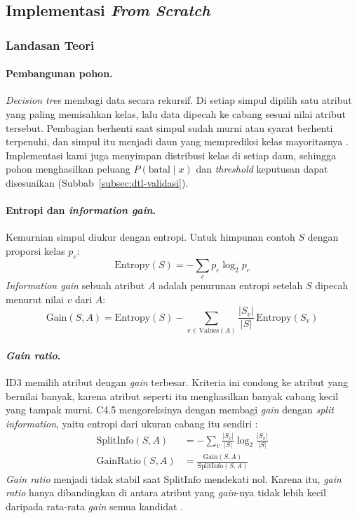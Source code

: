 \subsection{Implementasi \textit{From Scratch}}
\label{subsec:dtl-implementasi}

\subsubsection{Landasan Teori}

\paragraph{Pembangunan pohon.} \textit{Decision tree} membagi data secara rekursif. Di setiap simpul
dipilih satu atribut yang paling memisahkan kelas, lalu data dipecah ke cabang sesuai nilai atribut
tersebut. Pembagian berhenti saat simpul sudah murni atau syarat berhenti terpenuhi, dan simpul itu
menjadi daun yang memprediksi kelas mayoritasnya \cite{slide-dtl}. Implementasi kami juga menyimpan
distribusi kelas di setiap daun, sehingga pohon menghasilkan peluang $P(\text{batal} \mid x)$ dan
\textit{threshold} keputusan dapat disesuaikan (Subbab~\ref{subsec:dtl-validasi}).

\paragraph{Entropi dan \textit{information gain}.} Kemurnian simpul diukur dengan entropi. Untuk
himpunan contoh $S$ dengan proporsi kelas $p_c$:
\begin{equation}
	\text{Entropy}(S) = -\sum_{c} p_c \log_2 p_c
	\label{eq:dtl-entropy}
\end{equation}
\textit{Information gain} sebuah atribut $A$ adalah penurunan entropi setelah $S$ dipecah menurut
nilai $v$ dari $A$:
\begin{equation}
	\text{Gain}(S, A) = \text{Entropy}(S) - \sum_{v \in \text{Values}(A)} \frac{|S_v|}{|S|}\,\text{Entropy}(S_v)
	\label{eq:dtl-gain}
\end{equation}

\paragraph{\textit{Gain ratio}.} ID3 memilih atribut dengan \textit{gain} terbesar. Kriteria ini
condong ke atribut yang bernilai banyak, karena atribut seperti itu menghasilkan banyak cabang kecil
yang tampak murni. C4.5 mengoreksinya dengan membagi \textit{gain} dengan \textit{split information},
yaitu entropi dari ukuran cabang itu sendiri \cite{slide-dtl-issues}:
\begin{align}
	\text{SplitInfo}(S, A) &= -\sum_{v} \frac{|S_v|}{|S|} \log_2 \frac{|S_v|}{|S|} \\
	\text{GainRatio}(S, A) &= \frac{\text{Gain}(S, A)}{\text{SplitInfo}(S, A)}
	\label{eq:dtl-gain-ratio}
\end{align}
\textit{Gain ratio} menjadi tidak stabil saat $\text{SplitInfo}$ mendekati nol. Karena itu,
\textit{gain ratio} hanya dibandingkan di antara atribut yang \textit{gain}-nya tidak lebih kecil
daripada rata-rata \textit{gain} semua kandidat \cite{slide-dtl-issues}.


